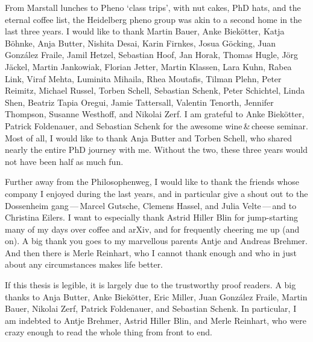 From Marstall lunches to Pheno `class trips', with nut cakes, PhD
hats, and the eternal coffee list, the Heidelberg pheno group was akin
to a second home in the last three years. I would like to thank Martin
Bauer, Anke Biek\"otter, Katja B\"ohnke, Anja Butter, Nishita Desai,
Karin Firnkes, Josua G\"ocking, Juan Gonz\'alez Fraile, Jamil Hetzel,
Sebastian Hoof, Jan Horak, Thomas Hugle, J\"org J\"ackel, Martin
Jankowiak, Florian Jetter, Martin Klassen, Lara Kuhn, Rabea Link,
Viraf Mehta, Luminita Mihaila, Rhea Moutafis, Tilman Plehn, Peter
Reimitz, Michael Russel, Torben Schell, Sebastian Schenk, Peter
Schichtel, Linda Shen, Beatriz Tapia Oregui, Jamie Tattersall,
Valentin Tenorth, Jennifer Thompson, Susanne Westhoff, and Nikolai
Zerf. I am grateful to Anke Biek\"otter, Patrick Foldenauer, and
Sebastian Schenk for the awesome wine\,\&\,cheese seminar. Most of
all, I would like to thank Anja Butter and Torben Schell, who shared
nearly the entire PhD journey with me. Without the two, these three
years would not have been half as much fun.

Further away from the Philosophenweg, I would like to thank the
friends whose company I enjoyed during the last years, and in
particular give a shout out to the Dossenheim gang\,---\,Marcel
Gutsche, Clemens Hassel, and Julia Velte\,---\,and to Christina
Eilers. I want to especially thank Astrid Hiller Blin for
jump-starting many of my days over coffee and arXiv, and for frequently
cheering me up (and on). A big thank you goes to my marvellous parents
Antje and Andreas Brehmer. And then there is Merle Reinhart, who I
cannot thank enough and who in just about any circumstances makes life
better.

If this thesis is legible, it is largely due to the trustworthy
proof readers. A big thanks to Anja Butter, Anke Biek\"otter, Eric
Miller, Juan Gonz\'alez Fraile, Martin Bauer, Nikolai Zerf, Patrick
Foldenauer, and Sebastian Schenk. In particular, I am indebted to
Antje Brehmer, Astrid Hiller Blin, and Merle Reinhart, who were crazy
enough to read the whole thing from front to end.

